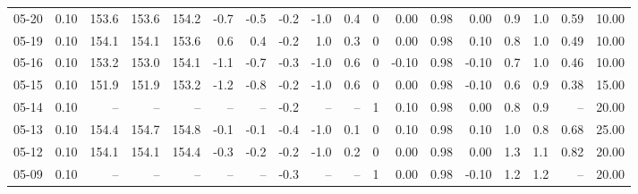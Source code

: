 \begin{threeparttable}
{\begin{tabular}{lrrrrrrrrrrrrrrrrr}
  05-20 &     0.10 & 153.6 & 153.6 & 154.2 &       -0.7 &           -0.5 &                      -0.2 &                     -1.0 &                 0.4 &              0 &       0.00 &      0.98 &           0.00 &              0.9 &                 1.0 &            0.59 &                  10.00 \\
  05-19 &     0.10 & 154.1 & 154.1 & 153.6 &        0.6 &            0.4 &                      -0.2 &                      1.0 &                 0.3 &              0 &       0.00 &      0.98 &           0.10 &              0.8 &                 1.0 &            0.49 &                  10.00 \\
  05-16 &     0.10 & 153.2 & 153.0 & 154.1 &       -1.1 &           -0.7 &                      -0.3 &                     -1.0 &                 0.6 &              0 &      -0.10 &      0.98 &          -0.10 &              0.7 &                 1.0 &            0.46 &                  10.00 \\
  05-15 &     0.10 & 151.9 & 151.9 & 153.2 &       -1.2 &           -0.8 &                      -0.2 &                     -1.0 &                 0.6 &              0 &       0.00 &      0.98 &          -0.10 &              0.6 &                 0.9 &            0.38 &                  15.00 \\
  05-14 &     0.10 &    -- &    -- &    -- &         -- &             -- &                      -0.2 &                       -- &                  -- &              1 &       0.10 &      0.98 &           0.00 &              0.8 &                 0.9 &              -- &                  20.00 \\
  05-13 &     0.10 & 154.4 & 154.7 & 154.8 &       -0.1 &           -0.1 &                      -0.4 &                     -1.0 &                 0.1 &              0 &       0.10 &      0.98 &           0.10 &              1.0 &                 0.8 &            0.68 &                  25.00 \\
  05-12 &     0.10 & 154.1 & 154.1 & 154.4 &       -0.3 &           -0.2 &                      -0.2 &                     -1.0 &                 0.2 &              0 &       0.00 &      0.98 &           0.00 &              1.3 &                 1.1 &            0.82 &                  20.00 \\
  05-09 &     0.10 &    -- &    -- &    -- &         -- &             -- &                      -0.3 &                       -- &                  -- &              1 &       0.00 &      0.98 &          -0.10 &              1.2 &                 1.2 &              -- &                  20.00 \\

\end{tabular}}
\end{threeparttable}
